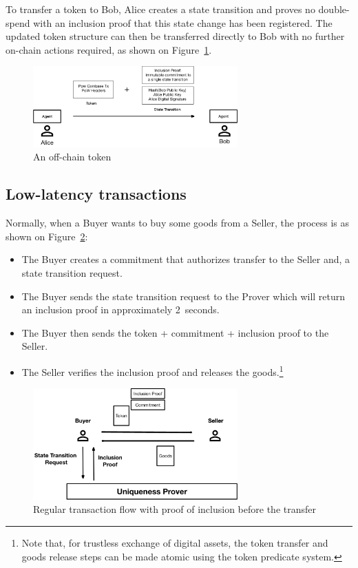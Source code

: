 \documentclass{article}
\begin{document}
To transfer a token to Bob, Alice creates a state transition and proves no double-spend with an inclusion proof that this state change has been registered. The updated token structure can then be transferred directly to Bob with no further on-chain actions required, as shown on Figure~\ref{fig:OffChain}.

\begin{figure}[H]
    \centering
    \includegraphics[width=0.7\textwidth]{OffChain.png}
    \caption{An off-chain token}
    \label{fig:OffChain}
\end{figure}

\subsection{Low-latency transactions}

Normally, when a Buyer wants to buy some goods from a Seller, the process is as shown on Figure~\ref{fig:LowLatency1}:
\begin{itemize}
  \item The Buyer creates a commitment that authorizes transfer to the Seller and, a state transition request.
  \item The Buyer sends the state transition request to the Prover which will return an inclusion proof in approximately 2~seconds.
  \item The Buyer then sends the token + commitment + inclusion proof to the Seller.
  \item The Seller verifies the inclusion proof and releases the goods.\footnote{Note that, for trustless exchange of digital assets, the token transfer and goods release steps can be made atomic using the token predicate system.}
\end{itemize}

\begin{figure}[ht]
    \centering
    \includegraphics[width=0.7\textwidth]{LowLatency1.png}
    \caption{Regular transaction flow with proof of inclusion before the transfer}
    \label{fig:LowLatency1}
\end{figure}
\end{document}
